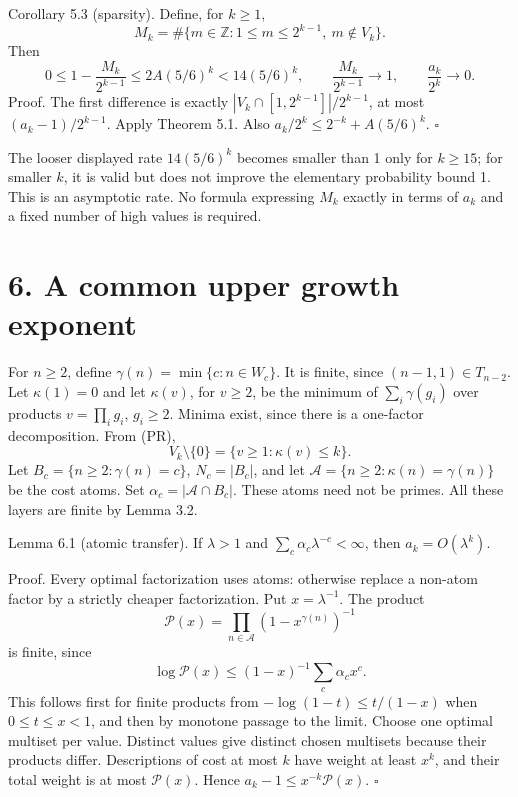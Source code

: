 \documentclass[11pt]{article}
\begin{document}
Corollary 5.3 (sparsity). Define, for \(k\ge1\),
\[
M_k=\#\{m\in\mathbb Z:1\le m\le2^{k-1},\ m\notin V_k\}.
\]
Then
\[
0\le1-\frac{M_k}{2^{k-1}}\le2A(5/6)^k<14(5/6)^k,\qquad
\frac{M_k}{2^{k-1}}\longrightarrow1,\qquad \frac{a_k}{2^k}\longrightarrow0.
\]
Proof. The first difference is exactly \(|V_k\cap[1,2^{k-1}]|/2^{k-1}\), at most \((a_k-1)/2^{k-1}\). Apply Theorem 5.1. Also \(a_k/2^k\le2^{-k}+A(5/6)^k\). \(\square\)

The looser displayed rate \(14(5/6)^k\) becomes smaller than 1 only for \(k\ge15\); for smaller \(k\), it is valid but does not improve the elementary probability bound 1. This is an asymptotic rate. No formula expressing \(M_k\) exactly in terms of \(a_k\) and a fixed number of high values is required.

\section*{6. A common upper growth exponent}

For \(n\ge2\), define \(\gamma(n)=\min\{c:n\in W_c\}\). It is finite, since \((n-1,1)\in T_{n-2}\). Let \(\kappa(1)=0\) and let \(\kappa(v)\), for \(v\ge2\), be the minimum of \(\sum_i\gamma(g_i)\) over products \(v=\prod_i g_i\), \(g_i\ge2\). Minima exist, since there is a one-factor decomposition. From (PR),
\[
V_k\setminus\{0\}=\{v\ge1:\kappa(v)\le k\}.\tag{COST}
\]
Let \(B_c=\{n\ge2:\gamma(n)=c\}\), \(N_c=|B_c|\), and let \(\mathcal A=\{n\ge2:\kappa(n)=\gamma(n)\}\) be the cost atoms. Set \(\alpha_c=|\mathcal A\cap B_c|\). These atoms need not be primes. All these layers are finite by Lemma 3.2.

Lemma 6.1 (atomic transfer). If \(\lambda>1\) and \(\sum_c\alpha_c\lambda^{-c}<\infty\), then \(a_k=O(\lambda^k)\).

Proof. Every optimal factorization uses atoms: otherwise replace a non-atom factor by a strictly cheaper factorization. Put \(x=\lambda^{-1}\). The product
\[
\mathcal P(x)=\prod_{n\in\mathcal A}(1-x^{\gamma(n)})^{-1}
\]
is finite, since
\[
\log\mathcal P(x)\le(1-x)^{-1}\sum_c\alpha_cx^c.
\]
This follows first for finite products from \(-\log(1-t)\le t/(1-x)\) when \(0\le t\le x<1\), and then by monotone passage to the limit. Choose one optimal multiset per value. Distinct values give distinct chosen multisets because their products differ. Descriptions of cost at most \(k\) have weight at least \(x^k\), and their total weight is at most \(\mathcal P(x)\). Hence \(a_k-1\le x^{-k}\mathcal P(x)\). \(\square\)
\end{document}
